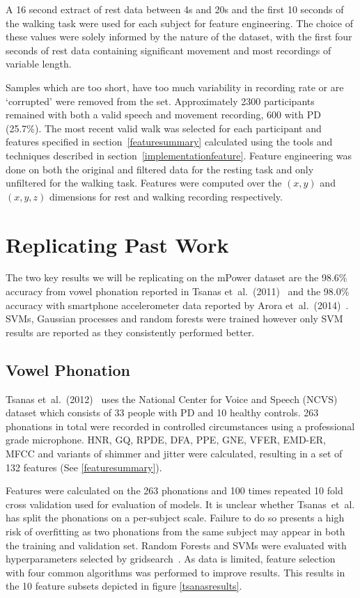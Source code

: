\documentclass[12pt, twoside]{book}
\begin{document}
A 16 second extract of rest data between 4s and 20s and the first 10 seconds of the walking task were used for each subject for feature engineering. The choice of these values were solely informed by the nature of the dataset, with the first four seconds of rest data containing significant movement and most recordings of variable length.

Samples which are too short, have too much variability in recording rate or are `corrupted' were removed from the set. Approximately 2300 participants remained with both a valid speech and movement recording, 600 with PD (25.7\%). The most recent valid walk was selected for each participant and features specified in section~\ref{featuresummary} calculated using the tools and techniques described in section~\ref{implementationfeature}.  Feature engineering was done on both the original and filtered data for the resting task and only unfiltered for the walking task. Features were computed over the $(x,y)$ and $(x,y,z)$ dimensions for rest and walking recording respectively.


\section{Replicating Past Work}
The two key results we will be replicating on the mPower dataset are the 98.6\% accuracy from vowel phonation reported in Tsanas et~al.~(2011)~\cite{tsanas2012novel} and the 98.0\% accuracy with smartphone accelerometer data reported by Arora et~al.~(2014)~\cite{arora2014high}. SVMs, Gaussian processes and random forests were trained however only SVM results are reported as they consistently performed better.

\subsection{Vowel Phonation}
\label{phonationpast}
Tsanas et~al.~(2012)~\cite{tsanas2012novel} uses the National Center for Voice and Speech (NCVS) dataset which consists of 33 people with PD and 10 healthy controls. 263 phonations in total were recorded in controlled circumstances using a professional grade microphone. HNR, GQ, RPDE, DFA, PPE, GNE, VFER, EMD-ER, MFCC and variants of shimmer and jitter were calculated, resulting in a set of 132 features (See \ref{featuresummary}).

Features were calculated on the 263 phonations and 100 times repeated 10 fold cross validation used for evaluation of models. It is unclear whether Tsanas~et~al. has split the phonations on a per-subject scale. Failure to do so presents a high risk of overfitting as two phonations from the same subject may appear in both the training and validation set. Random Forests and SVMs were evaluated with hyperparameters selected by gridsearch~\cite{gridsearch}. As data is limited, feature selection with four common algorithms was performed to improve results. This results in the 10 feature subsets depicted in figure \ref{tsanasresults}.
\end{document}
